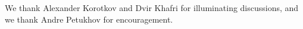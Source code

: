 
We thank Alexander Korotkov and Dvir Khafri for illuminating discussions, and we thank Andre Petukhov for encouragement.
